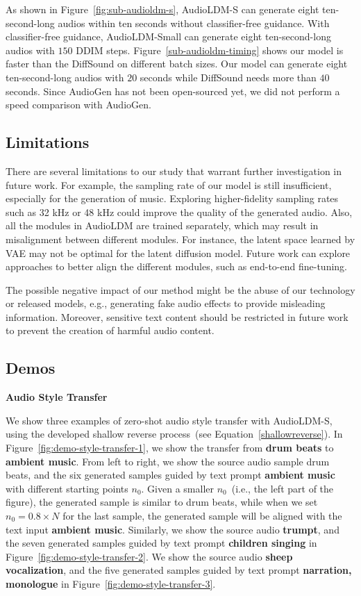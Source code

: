 As shown in Figure~\ref{fig:sub-audioldm-s}, AudioLDM-S can generate eight ten-second-long audios within ten seconds without classifier-free guidance. With classifier-free guidance, AudioLDM-Small can generate eight ten-second-long audios with $150$ DDIM steps. Figure~\ref{sub-audioldm-timing} shows our model is faster than the DiffSound on different batch sizes. Our model can generate eight ten-second-long audios with $20$ seconds while DiffSound needs more than $40$ seconds. Since AudioGen has not been open-sourced yet, we did not perform a speed comparison with AudioGen.

\subsection{Limitations}

There are several limitations to our study that warrant further investigation in future work. For example, the sampling rate of our model is still insufficient, especially for the generation of music. Exploring higher-fidelity sampling rates such as 32 kHz or 48 kHz could improve the quality of the generated audio. Also, all the modules in AudioLDM are trained separately, which may result in misalignment between different modules. For instance, the latent space learned by VAE may not be optimal for the latent diffusion model. Future work can explore approaches to better align the different modules, such as end-to-end fine-tuning.

The possible negative impact of our method might be the abuse of our technology or released models, e.g., generating fake audio effects to provide misleading information. Moreover, sensitive text content should be restricted in future work to prevent the creation of harmful audio content.

\newpage
\subsection{Demos}
\label{app:demos}

\textbf{Audio Style Transfer}

We show three examples of zero-shot audio style transfer with AudioLDM-S, using the developed shallow reverse process~(see Equation~\ref{shallowreverse}). In Figure~\ref{fig:demo-style-transfer-1}, we show the transfer from \textbf{drum beats} to \textbf{ambient music}. From left to right, we show the source audio sample drum beats, and the six generated samples guided by text prompt \textbf{ambient music} with different starting points $n_{0}$. Given a smaller $n_{0}$~(i.e., the left part of the figure), the generated sample is similar to drum beats, while when we set $n_{0}=0.8\times N$ for the last sample, the generated sample will be aligned with the text input \textbf{ambient music}. Similarly, we show the source audio \textbf{trumpt}, and the seven generated samples guided by text prompt \textbf{children singing} in Figure~\ref{fig:demo-style-transfer-2}. We show the source audio \textbf{sheep vocalization}, and the five generated samples guided by text prompt \textbf{narration, monologue} in Figure~\ref{fig:demo-style-transfer-3}.

